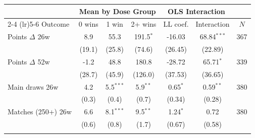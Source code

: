 \begin{tabular}{l ccc cc c}
\toprule
 & \multicolumn{3}{c}{Mean by Dose Group} & \multicolumn{2}{c}{OLS Interaction} & \\
\cmidrule(lr){2-4} \cmidrule(lr){5-6}
Outcome & 0 wins & 1 win & 2+ wins & LL coef. & Interaction & $N$ \\
\midrule
Points $\Delta$ 26w & 8.9 & 55.3 & 191.5$^{*}$ & -16.03 & 68.84$^{***}$ & 367 \\
 & (19.1) & (25.8) & (74.6) & (26.45) & (22.89) & \\
\addlinespace
Points $\Delta$ 52w & -1.2 & 48.8 & 180.8 & -28.72 & 65.71$^{*}$ & 339 \\
 & (28.7) & (45.9) & (126.0) & (37.53) & (36.65) & \\
\addlinespace
Main draws 26w & 4.2 & 5.5$^{***}$ & 5.9$^{**}$ & 0.65$^{*}$ & 0.59$^{**}$ & 380 \\
 & (0.3) & (0.4) & (0.7) & (0.34) & (0.28) & \\
\addlinespace
Matches (250+) 26w & 6.6 & 8.1$^{***}$ & 9.5$^{**}$ & 1.24$^{*}$ & 0.72 & 380 \\
 & (0.6) & (0.8) & (1.7) & (0.67) & (0.58) & \\
\addlinespace
\bottomrule
\end{tabular}
